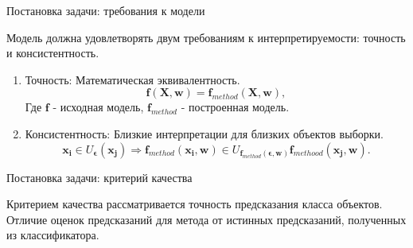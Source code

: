 \documentclass{beamer}
\begin{document}
\begin{frame}{Постановка задачи: требования к модели}

Модель должна удовлетворять двум требованиям к интерпретируемости: $\textbf{точность}$ и $\textbf{консистентность}$.
\begin{enumerate}
   \item{Точность}:
    Математическая эквивалентность.
    $$\mathbf{f}(\mathbf{X}, \mathbf{w}) = \mathbf{f}_{method}(\mathbf{X}, \mathbf{w}),$$ Где $\mathbf{f}$ - исходная модель, $\mathbf{f}_{method}$ - построенная модель.
    \item{Консистентность}:
    Близкие интерпретации для близких объектов выборки. $$\mathbf{x_i} \in U_\mathbf{\epsilon}(\mathbf{x_j}) \Longrightarrow \mathbf{f}_{method}(\mathbf{x_i}, \mathbf{w}) \in U_{\mathbf{f}_{method}(\mathbf{\epsilon}, \mathbf{w})}\mathbf{f}_{methood}(\mathbf{x_j}, \mathbf{w}).$$
\end{enumerate}
\end{frame}
\begin{frame}{Постановка задачи: критерий качества}

Критерием качества рассматривается точность предсказания класса объектов. Отличие оценок предсказаний для метода от истинных предсказаний, полученных из классификатора.

\end{frame}
\end{document}
